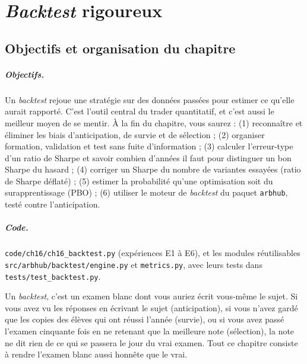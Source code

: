 \chapter{\emph{Backtest} rigoureux}
\label{ch:16}

\section{Objectifs et organisation du chapitre}

\paragraph{Objectifs.} Un \emph{backtest} rejoue une stratégie sur des données passées pour estimer ce qu'elle aurait rapporté. C'est l'outil central du trader quantitatif, et c'est aussi le meilleur moyen de se mentir. À la fin du chapitre, vous saurez : (1) reconnaître et éliminer les biais d'anticipation, de survie et de sélection ; (2) organiser formation, validation et test sans fuite d'information ; (3) calculer l'erreur-type d'un ratio de Sharpe et savoir combien d'années il faut pour distinguer un bon Sharpe du hasard ; (4) corriger un Sharpe du nombre de variantes essayées (ratio de Sharpe déflaté) ; (5) estimer la probabilité qu'une optimisation soit du surapprentissage (PBO) ; (6) utiliser le moteur de \emph{backtest} du paquet \texttt{arbhub}, testé contre l'anticipation.

\paragraph{Code.}\sloppy \texttt{code/ch16/ch16\_backtest.py} (expériences E1 à E6), et les modules réutilisables \texttt{src/arbhub/backtest/engine.py} et \texttt{metrics.py}, avec leurs tests dans \texttt{tests/test\_backtest.py}.

\begin{intuition}
Un \emph{backtest}, c'est un examen blanc dont vous auriez écrit vous-même le sujet. Si vous avez vu les réponses en écrivant le sujet (anticipation), si vous n'avez gardé que les copies des élèves qui ont réussi l'année (survie), ou si vous avez passé l'examen cinquante fois en ne retenant que la meilleure note (sélection), la note ne dit rien de ce qui se passera le jour du vrai examen. Tout ce chapitre consiste à rendre l'examen blanc aussi honnête que le vrai.
\end{intuition}

